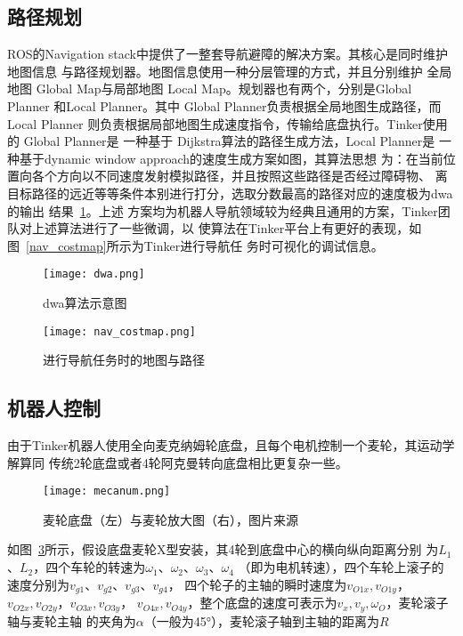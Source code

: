 \subsection{路径规划}

ROS的Navigation stack中提供了一整套导航避障的解决方案。其核心是同时维护地图信息
与路径规划器。地图信息使用一种分层管理的方式\cite{lu2014layered}，并且分别维护
全局地图 Global Map与局部地图 Local Map。规划器也有两个，分别是Global Planner
和Local Planner。其中 Global Planner负责根据全局地图生成路径，而 Local Planner
则负责根据局部地图生成速度指令，传输给底盘执行。Tinker使用的 Global Planner是
一种基于 Dijkstra算法\cite{deng2012fuzzy}的路径生成方法，Local Planner是
一种基于dynamic window approach的速度生成方案\cite{fox1997dynamic}如图，其算法思想
为：在当前位置向各个方向以不同速度发射模拟路径，并且按照这些路径是否经过障碍物、
离目标路径的远近等等条件本别进行打分，选取分数最高的路径对应的速度极为dwa的输出
结果~\ref{fig:dwa}。上述
方案均为机器人导航领域较为经典且通用的方案，Tinker团队对上述算法进行了一些微调，以
使算法在Tinker平台上有更好的表现，如图~\ref{nav_costmap}所示为Tinker进行导航任
务时可视化的调试信息。


\begin{figure}[h] %
  \centering
  \texttt{[image: dwa.png]}
  \caption{dwa算法示意图}
  \label{fig:dwa}
\end{figure}


\begin{figure}[h] %
  \centering
  \texttt{[image: nav\_costmap.png]}
  \caption{进行导航任务时的地图与路径}
  \label{fig:nav_costmap}
\end{figure}

\subsection{机器人控制}

由于Tinker机器人使用全向麦克纳姆轮底盘，且每个电机控制一个麦轮，其运动学解算同
传统2轮底盘或者4轮阿克曼转向底盘相比更复杂一些。


\begin{figure}[h] %
  \centering
  \texttt{[image: mecanum.png]}
  \caption{麦轮底盘（左）与麦轮放大图（右），图片来源\cite{mecanum}}
  \label{fig:mecanum}
\end{figure}

如图~\ref{fig:mecanum}所示，假设底盘麦轮X型安装，其4轮到底盘中心的横向纵向距离分别
为$L_1$、$L_2$，四个车轮的转速为$\omega_1$、$\omega_2$、$\omega_3$、$\omega_4$
（即为电机转速），四个车轮上滚子的速度分别为$v_{g1}$、$v_{g2}$、$v_{g3}$、$v_{g4}$，
四个轮子的主轴的瞬时速度为$v_{O1x}, v_{O1y}$，$v_{O2x}, v_{O2y}$，$v_{O3x}, v_{O3y}$，
$v_{O4x}, v_{O4y}$，整个底盘的速度可表示为$v_x, v_y, \omega_O$，麦轮滚子轴与麦轮主轴
的夹角为$\alpha$（一般为\ang{45}），麦轮滚子轴到主轴的距离为$R$


